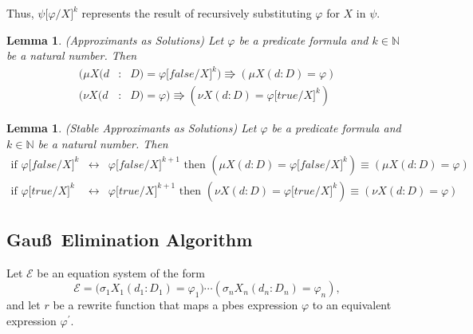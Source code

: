 \documentclass{article}
\newtheorem{lemma}[theorem]{Lemma}
\begin{document}
Thus, $\psi \lbrack \varphi /X]^{k}$ represents the result of recursively
substituting $\varphi $ for $X$ in $\psi $.

\begin{lemma}
(Approximants as Solutions) Let $\varphi $ be a predicate formula and $k\in
\mathbb{N}$ be a natural number. Then%
\begin{eqnarray*}
(\mu X(d &:&D)=\varphi \lbrack false /X]^{k})\Rrightarrow (\mu
X(d:D)=\varphi ) \\
(\nu X(d &:&D)=\varphi )\Rrightarrow (\nu X(d:D)=\varphi \lbrack true
/X]^{k})
\end{eqnarray*}
\end{lemma}

\begin{lemma}
(Stable Approximants as Solutions) Let $\varphi $ be a predicate formula and
$k\in \mathbb{N}$ be a natural number. Then%
\begin{eqnarray*}
\text{if }\varphi \lbrack false/X]^{k} &\longleftrightarrow &\varphi \lbrack
false/X]^{k+1}\text{ then }(\mu X(d:D)=\varphi \lbrack false/X]^{k})\equiv
(\mu X(d:D)=\varphi ) \\
\text{if }\varphi \lbrack true/X]^{k} &\longleftrightarrow &\varphi \lbrack
true/X]^{k+1}\text{ then }(\nu X(d:D)=\varphi \lbrack true/X]^{k})\equiv
(\nu X(d:D)=\varphi )
\end{eqnarray*}
\end{lemma}

\subsection{Gau\ss\ Elimination Algorithm}

Let $\mathcal{E}$ be an equation system of the form%
\begin{equation*}
\mathcal{E=(}\sigma _{1}X_{1}(d_{1}:D_{1})=\varphi _{1})\cdots (\sigma
_{n}X_{n}(d_{n}:D_{n})=\varphi _{n}),
\end{equation*}%
and let $r$ be a rewrite function that maps a pbes expression $\varphi $ to
an equivalent expression $\varphi ^{\prime }$.
\end{document}
